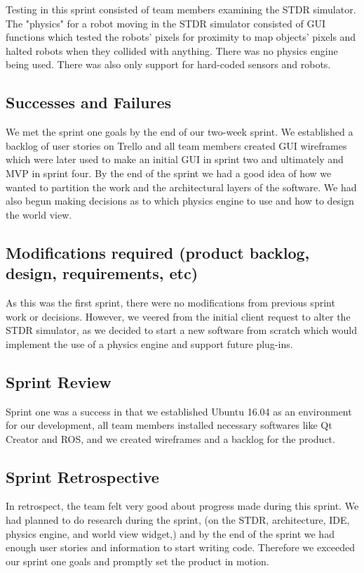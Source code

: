 Testing in this sprint consisted of team members examining the STDR simulator. The "physics" for a robot moving in the STDR simulator consisted of GUI functions which tested the robots' pixels for proximity to map objects' pixels and halted robots when they collided with anything. There was no physics engine being used. There was also only support for hard-coded sensors and robots.

\subsection{Successes and Failures}

We met the sprint one goals by the end of our two-week sprint. We established a backlog of user stories on Trello and all team members created GUI wireframes which were later used to make an initial GUI in sprint two and ultimately and MVP in sprint four. By the end of the sprint we had a good idea of how we wanted to partition the work and the architectural layers of the software. We had also begun making decisions as to which physics engine to use and how to design the world view.

\subsection{Modifications required (product backlog, design, requirements, etc)}

As this was the first sprint, there were no modifications from previous sprint work or decisions. However, we veered from the initial client request to alter the STDR simulator, as we decided to start a new software from scratch which would implement the use of a physics engine and support future plug-ins.

\subsection{Sprint Review}

Sprint one was a success in that we established Ubuntu 16.04 as an environment for our development, all team members installed necessary softwares like Qt Creator and ROS, and we created wireframes and a backlog for the product. 

\subsection{Sprint Retrospective}

In retrospect, the team felt very good about progress made during this sprint. We had planned to do research during the sprint, (on the STDR, architecture, IDE, physics engine, and world view widget,) and by the end of the sprint we had enough user stories and information to start writing code. Therefore we exceeded our sprint one goals and promptly set the product in motion.

